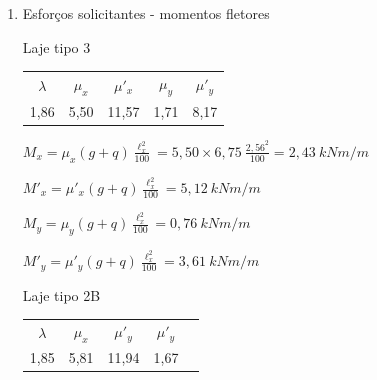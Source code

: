 \begin{resposta}
    \begin{enumerate}[start=6]

        \item Esforços solicitantes - momentos fletores


        

        

        

        Laje tipo 3 \cite[tabela 2.3b]{tabelalajes}

        \begin{table}[h]
            \centering
            \color{gray!80!black}
            \begin{tabular}{c c c c c}
                $\lambda$ & $\mu_x$ & $\mu'_x$ & $\mu_y$ & $\mu'_y$ \\
                1,86 & 5,50 & 11,57 & 1,71 & 8,17
            \end{tabular}
        \end{table}

        $M_x = \mu_x (g+q) \frac{\ell_x^2}{100} = 5,50 \times 6,75 \ \frac{2,56^2}{100} = 2,43 \ kN m/m$

        $M'_x = \mu'_x (g+q) \frac{\ell_x^2}{100} = 5,12 \ kN m/m$

        $M_y = \mu_y (g+q) \frac{\ell_x^2}{100} = 0,76 \ kN m/m$

        $M'_y = \mu'_y (g+q) \frac{\ell_x^2}{100} = 3,61 \ kN m/m$ \newline

        \newpage
        

        

        

        

        Laje tipo 2B \cite[tabela 2.3a]{tabelalajes}

        \begin{table}[h]
            \centering
            \color{gray!80!black}
            \begin{tabular}{c c c c c}
                $\lambda$ & $\mu_x$ & $\mu'_y$ & $\mu'_y$ \\
                1,85 & 5,81 & 11,94 & 1,67
            \end{tabular}
        \end{table}


\end{enumerate}
\end{resposta}

